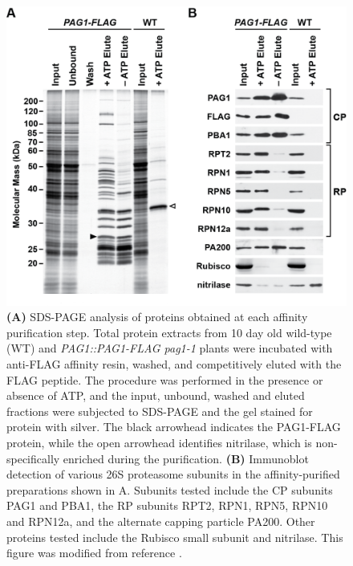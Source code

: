 \begin{figure}[p]
	\centering
	\includegraphics[width=\columnwidth]{intro/pag1flagap.png}
	{\citep{book10} \textbf{(A)} SDS-PAGE analysis of proteins obtained at each affinity purification step.  Total protein extracts from 10 day old wild-type (WT) and \textit{PAG1::PAG1-FLAG pag1-1} plants were incubated with anti-FLAG affinity resin, washed, and competitively eluted with the FLAG peptide. The procedure was performed in the presence or absence of ATP, and the input, unbound, washed and eluted fractions were subjected to SDS-PAGE and the gel stained for protein with silver.  The black arrowhead indicates the PAG1-FLAG protein, while the open arrowhead identifies nitrilase, which is non-specifically enriched during the purification. \textbf{(B)} Immunoblot detection of various 26S proteasome subunits in the affinity-purified preparations shown in A. Subunits tested include the CP subunits PAG1 and PBA1, the RP subunits RPT2, RPN1, RPN5, RPN10 and RPN12a, and the alternate capping particle PA200.  Other proteins tested include the Rubisco small subunit and nitrilase. This figure was modified from reference \citep{book10}.}
	\label{fig:pag1flagap}
\end{figure}

